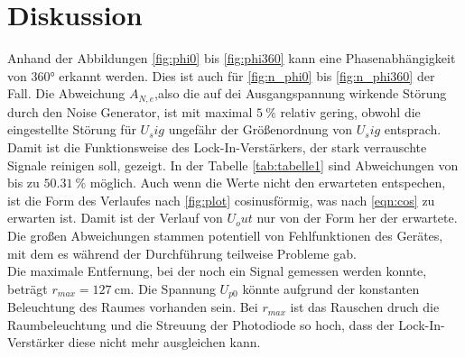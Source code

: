 \section{Diskussion}

Anhand der Abbildungen \ref{fig:phi0} bis \ref{fig:phi360} kann eine Phasenabhängigkeit von 360° erkannt werden.
Dies ist auch für \ref{fig:n_phi0} bis \ref{fig:n_phi360} der Fall.
Die Abweichung $A_{N,e}$,also die auf dei Ausgangspannung wirkende Störung durch den Noise Generator, ist mit maximal $\qty{5}{\percent}$ relativ gering, obwohl die eingestellte Störung für $U_sig$ ungefähr der Größenordnung von $U_sig$ entsprach.
Damit ist die Funktionsweise des Lock-In-Verstärkers, der stark verrauschte Signale reinigen soll, gezeigt. 
In der Tabelle \ref{tab:tabelle1} sind Abweichungen
von bis zu $\qty{50.31}{\percent}$ möglich.
Auch wenn die Werte nicht den erwarteten entspechen, ist die Form des Verlaufes nach \ref{fig:plot} cosinusförmig, was nach \ref{eqn:cos} zu erwarten ist.
Damit ist der Verlauf von $U_out$ nur von der Form her der erwartete.
Die großen Abweichungen stammen potentiell von Fehlfunktionen des Gerätes, mit dem es während der Durchführung teilweise Probleme gab.\\

\noindent 
Die maximale Entfernung, bei der noch ein Signal gemessen werden konnte, beträgt $r_{max}=\qty{127}{\centi\meter}$.
Die Spannung $U_{p0}$ könnte aufgrund der konstanten Beleuchtung des Raumes vorhanden sein.
Bei $r_{max}$ ist das Rauschen druch die Raumbeleuchtung und die Streuung der Photodiode so hoch, dass der Lock-In-Verstärker diese nicht mehr ausgleichen kann.

\label{sec:Diskussion}
